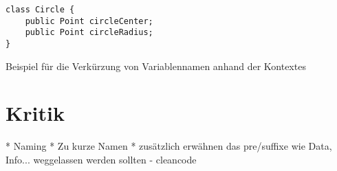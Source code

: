 \begin{listing}[H]
    \begin{verbatim}
class Circle {
    public Point circleCenter;
    public Point circleRadius;
}
    \end{verbatim}
    \caption{Beispiel für die Verkürzung von Variablennamen anhand der Kontextes}
    \label{paper1:contextbasednames}
\end{listing}


\section{Kritik}

  * Naming
    * Zu kurze Namen
    * zusätzlich erwähnen das pre/suffixe wie Data, Info... weggelassen werden sollten - cleancode
